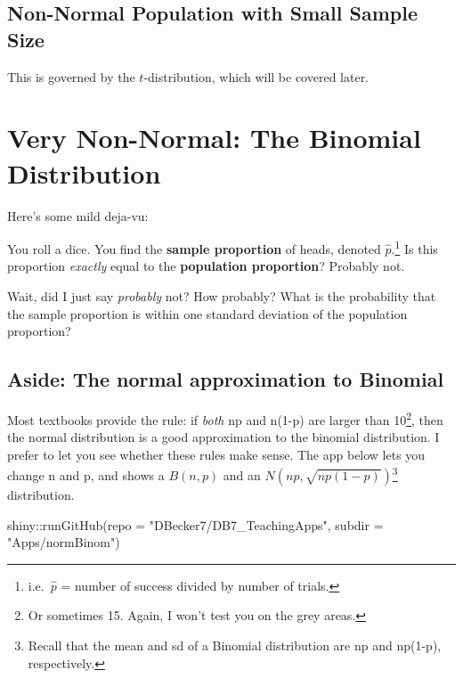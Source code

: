 \documentclass[
  letterpaper,
  DIV=11,
  numbers=noendperiod]{scrreprt}
\newenvironment{Shaded}{\begin{snugshade}}{\end{snugshade}}
\newcommand{\AttributeTok}[1]{\textcolor[rgb]{0.40,0.45,0.13}{#1}}
\newcommand{\FunctionTok}[1]{\textcolor[rgb]{0.28,0.35,0.67}{#1}}
\newcommand{\NormalTok}[1]{\textcolor[rgb]{0.00,0.23,0.31}{#1}}
\newcommand{\SpecialCharTok}[1]{\textcolor[rgb]{0.37,0.37,0.37}{#1}}
\newcommand{\StringTok}[1]{\textcolor[rgb]{0.13,0.47,0.30}{#1}}
\begin{document}
\hypertarget{non-normal-population-with-small-sample-size}{%
\subsection{Non-Normal Population with Small Sample
Size}\label{non-normal-population-with-small-sample-size}}

This is governed by the \(t\)-distribution, which will be covered later.

\hypertarget{very-non-normal-the-binomial-distribution}{%
\section{Very Non-Normal: The Binomial
Distribution}\label{very-non-normal-the-binomial-distribution}}

Here's some mild deja-vu:

You roll a dice. You find the \textbf{sample proportion} of heads,
denoted \(\hat p\).\footnote{i.e.~\(\hat p\) = number of success divided
  by number of trials.} Is this proportion \emph{exactly} equal to the
\textbf{population proportion}? Probably not.

Wait, did I just say \emph{probably} not? How probably? What is the
probability that the sample proportion is within one standard deviation
of the population proportion?

\hypertarget{aside-the-normal-approximation-to-binomial}{%
\subsection{Aside: The normal approximation to
Binomial}\label{aside-the-normal-approximation-to-binomial}}

Most textbooks provide the rule: if \emph{both} np and n(1-p) are larger
than 10\footnote{Or sometimes 15. Again, I won't test you on the grey
  areas.}, then the normal distribution is a good approximation to the
binomial distribution. I prefer to let you see whether these rules make
sense. The app below lets you change n and p, and shows a \(B(n, p)\)
and an \(N(np, \sqrt{np(1-p)})\)\footnote{Recall that the mean and sd of
  a Binomial distribution are np and np(1-p), respectively.}
distribution.

\begin{Shaded}
\begin{Highlighting}[]
\NormalTok{shiny}\SpecialCharTok{::}\FunctionTok{runGitHub}\NormalTok{(}\AttributeTok{repo =} \StringTok{"DBecker7/DB7\_TeachingApps"}\NormalTok{, }
    \AttributeTok{subdir =} \StringTok{"Apps/normBinom"}\NormalTok{)}
\end{Highlighting}
\end{Shaded}
\end{document}

